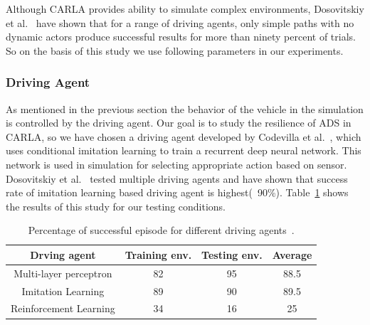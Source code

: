  
 Although CARLA provides ability to simulate complex environments, Dosovitskiy et al.~\cite{Dosovitskiy17} have shown that for a range of driving agents, only simple paths with no dynamic actors produce successful results for more than ninety percent of trials. So on the basis of this study we use following parameters in our experiments.
 
 \subsubsection{Driving Agent}
 As mentioned in the previous section the behavior of the vehicle in the simulation is controlled by the driving agent. Our goal is to study the resilience of ADS in CARLA, so we have chosen a driving agent developed by Codevilla et al.~\cite{Codevilla2018}, which uses conditional imitation learning to train a recurrent deep neural network. This network is used in simulation for selecting appropriate action based on sensor. Dosovitskiy et al.~\cite{Dosovitskiy17} tested multiple driving agents and have shown that success rate of imitation learning based driving agent is highest(~90\%). Table~\ref{table:1} shows the results of this study for our testing conditions.
 
\begin{table}
	\vspace{1.0em}
	\begin{tabular}{| c | c | c | c |}
		\hline
		Drving agent & Training env. & Testing env. & Average  \\
		\hline
		Multi-layer perceptron & 82 & 95 & 88.5  \\ 
 		Imitation Learning & 89 & 90 & 89.5 \\  
 		Reinforcement Learning  & 34 & 16 & 25 \\
 		\hline
 	\end{tabular}
 \caption{Percentage of successful episode for different driving agents~\cite{Dosovitskiy17}.}
 \label{table:1}
 \vspace{-2.0em}
\end{table}

